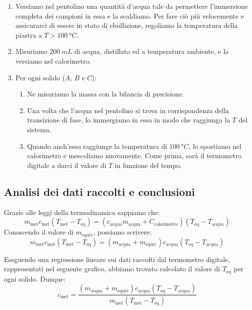 \documentclass{article}
\begin{document}
\begin{enumerate}
    \item
        Versiamo nel pentolino una quantità d'acqua tale da permettere l'immersione
        completa dei campioni in essa e la scaldiamo. Per fare ciò più velocemente
        e assicurarci di essere in stato di ebollizione, regoliamo la temperatura
        della piastra a $T>\qty{100}{\degree C}$.
    \item
        Misuriamo $\qty{200}{mL}$ di acqua, distillata ed a temperatura ambiente,
        e la versiamo nel calorimetro.
    \item
        Per ogni solido ($A$, $B$ e $C$):
    \begin{enumerate}
        \item
            Ne misuriamo la massa con la bilancia di precisione.
        \item
            Una volta che l'acqua nel pentolino si trova in corrispondenza della
            transizione di fase, lo immergiamo in essa in modo che raggiunga la
            $T$ del sistema.
        \item
            Quando anch'esso raggiunge la temperatura di $\qty{100}{\degree C}$,
            lo spostiamo nel calorimetro e mescoliamo nuovamente. Come prima, sarà
            il termometro digitale a darci il valore di $T$ in funzione del tempo.
    \end{enumerate}
\end{enumerate}



\subsection{Analisi dei dati raccolti e conclusioni}
Grazie alle leggi della termodinamica sappiamo che:
    \[
        m_\text{met} c_\text{met} (T_\text{met}-T_\text{eq}) =
        (c_\text{acqua} m_\text{acqua} + C_\text{calorimetro}) (T_\text{eq}-T_\text{acqua})
    \]
Conoscendo il valore di $m_\text{equiv}$, possiamo scrivere:
    \[
        m_\text{met} c_\text{met} (T_\text{met}-T_\text{eq}) =
        (m_\text{acqua} + m_\text{equiv}) c_\text{acqua} (T_\text{eq}-T_\text{acqua})
    \]

Eseguendo una regressione lineare sui dati raccolti dal termometro digitale, rappresentati nel    %
seguente grafico, abbiamo trovato calcolato il valore di $T_\text{eq}$ per ogni solido. Dunque:    %
    \[
        c_\text{met} = \frac{(m_\text{acqua} + m_\text{equiv}) c_\text{acqua} (T_\text{eq}-T_\text{acqua})}
        {m_\text{met} (T_\text{met}-T_\text{eq})}
    \]
\end{document}
